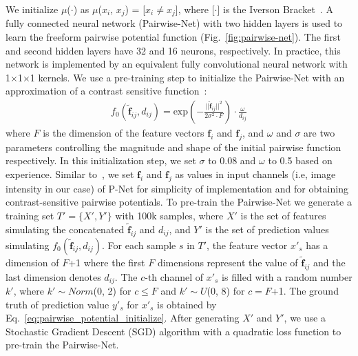 \documentclass[10pt,journal,compsoc]{IEEEtran}
\begin{document}
We initialize $\mu$($\cdot$) as $\mu$($x_i$, $x_j$) = [$x_i\neq x_j$], where [$\cdot$] is the Iverson Bracket~\cite{Zheng2015a}.
A fully connected neural network (Pairwise-Net) with two hidden layers is used to learn the freeform pairwise potential function (Fig.~\ref{fig:pairwise-net}). The first and second hidden layers have 32 and 16 neurons, respectively. In practice, this network is implemented by an equivalent fully convolutional neural network with 1$\times$1$\times$1 kernels. We use a pre-training step to initialize the Pairwise-Net with an approximation of a contrast sensitive function~\cite{Boykov2001}:
\begin{align}
	f_0(\mathbf{\tilde{f}}_{ij},d_{ij})= \text{exp}\left(-\frac{||\mathbf{\tilde{f}}_{ij}||^2}{2\sigma^2\cdot F}\right)\cdot \frac{\omega}{d_{ij}}
	\label{eq:pairwise_potential_initialize}
\end{align}
where $F$ is the dimension of the feature vectors $\mathbf{f}_i$ and $\mathbf{f}_j$, and $\omega$ and $\sigma$ are two parameters controlling the magnitude and shape of the initial pairwise function respectively. In this initialization step, we set $\sigma$ to 0.08 and $\omega$ to 0.5 based on experience. Similar to~\cite{Krahenbuhl2011, Chen2016deeplab, Zheng2015a}, we set $\mathbf{f}_i$ and $\mathbf{f}_j$ as values in input channels (i.e, image intensity in our case) of P-Net for simplicity of implementation and for obtaining contrast-sensitive pairwise potentials. To pre-train the Pairwise-Net we generate a training set $T'=\{X',Y'\}$ with 100k samples, where $X'$ is the set of features simulating the concatenated $\mathbf{\tilde{f}}_{ij}$ and $d_{ij}$, and $Y'$ is the set of prediction values simulating $f_0(\mathbf{\tilde{f}}_{ij}, d_{ij})$. For each sample $s$ in $T'$, the feature vector $x'_s$ has a dimension of $F$+1 where the first $F$ dimensions represent the value of $\mathbf{\tilde{f}}_{ij}$ and the last dimension denotes $d_{ij}$. The $c$-th channel of $x'_s$ is filled with a random number $k'$, where $k'\sim Norm$(0, 2) for $c\leq F$ and  $k'\sim U$(0, 8) for $c =F$+1. The ground truth of prediction value $y'_s$ for $x'_s$ is obtained by Eq.~\eqref{eq:pairwise_potential_initialize}. After generating $X'$ and $Y'$, we use a Stochastic Gradient Descent (SGD) algorithm with a quadratic loss function to pre-train the Pairwise-Net.%
\end{document}
